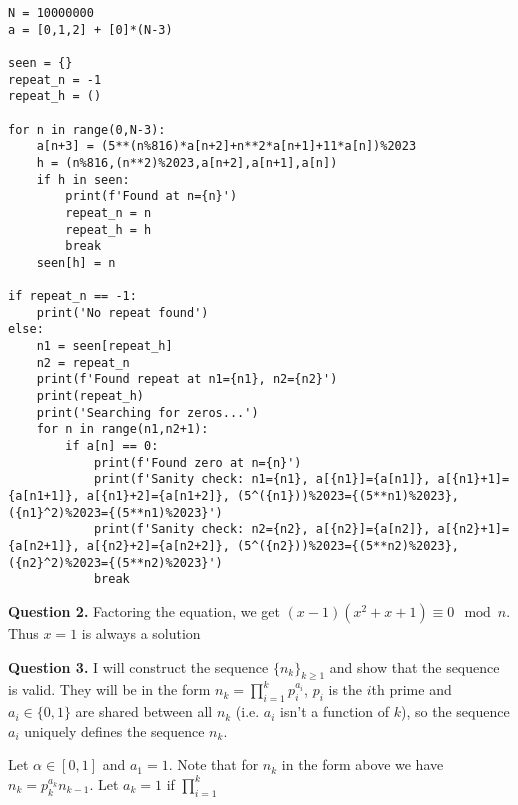 \documentclass[letterpaper, reqno,11pt]{article}
\begin{document}
\begin{lstlisting}
N = 10000000
a = [0,1,2] + [0]*(N-3)

seen = {}
repeat_n = -1
repeat_h = ()

for n in range(0,N-3):
    a[n+3] = (5**(n%816)*a[n+2]+n**2*a[n+1]+11*a[n])%2023
    h = (n%816,(n**2)%2023,a[n+2],a[n+1],a[n])
    if h in seen:
        print(f'Found at n={n}')
        repeat_n = n
        repeat_h = h
        break
    seen[h] = n

if repeat_n == -1:
    print('No repeat found')
else:
    n1 = seen[repeat_h]
    n2 = repeat_n
    print(f'Found repeat at n1={n1}, n2={n2}')
    print(repeat_h)
    print('Searching for zeros...')
    for n in range(n1,n2+1):
        if a[n] == 0:
            print(f'Found zero at n={n}')
            print(f'Sanity check: n1={n1}, a[{n1}]={a[n1]}, a[{n1}+1]={a[n1+1]}, a[{n1}+2]={a[n1+2]}, (5^({n1}))%2023={(5**n1)%2023}, ({n1}^2)%2023={(5**n1)%2023}')
            print(f'Sanity check: n2={n2}, a[{n2}]={a[n2]}, a[{n2}+1]={a[n2+1]}, a[{n2}+2]={a[n2+2]}, (5^({n2}))%2023={(5**n2)%2023}, ({n2}^2)%2023={(5**n2)%2023}')
            break
\end{lstlisting}

{\medskip\noindent\bf Question 2.} Factoring the equation, we get $(x-1)(x^2+x+1)\equiv 0\mod n$. Thus $x=1$ is always a solution

{\medskip\noindent\bf Question 3.} I will construct the sequence $\{n_k\}_{k\geq 1}$ and show that the sequence is valid. They will be in the form $n_k=\prod_{i=1}^{k}p_i^{a_i}$, $p_i$ is the $i$th prime and $a_i\in \{0,1\}$ are shared between all $n_k$ (i.e. $a_i$ isn't a function of $k$), so the sequence $a_i$ uniquely defines the sequence $n_k$. 

Let $\alpha\in [0,1]$ and $a_1=1$. Note that for $n_k$ in the form above we have $n_k=p_k^{a_k}n_{k-1}$. Let $a_k=1$ if $\prod_{i=1}^{k}$
\end{document}
